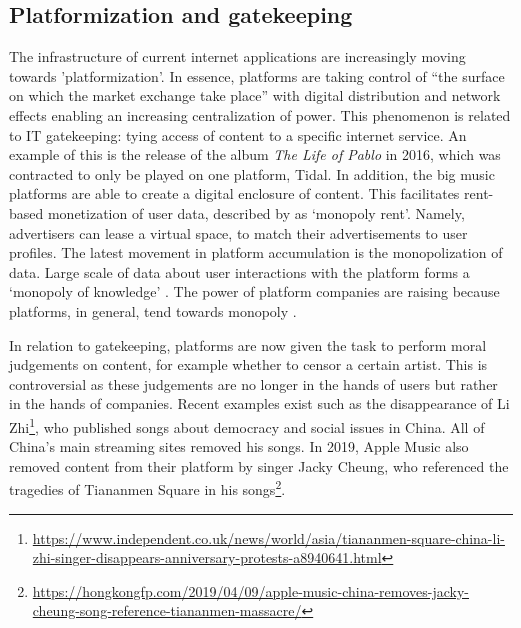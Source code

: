 
\subsection{Platformization and gatekeeping}
The infrastructure of current internet applications are increasingly moving towards 'platformization'. In essence, platforms are taking control of ``the surface on which the market exchange take place'' \citep{andersson2016mastering} with digital distribution and network effects enabling an increasing centralization of power. This phenomenon is related to IT gatekeeping: tying access of content to a specific internet service. An example of this is the release of the album \textit{The Life of Pablo} in 2016, which was contracted to only be played on one platform, Tidal. In addition, the big music platforms are able to create a digital enclosure of content. This facilitates rent-based monetization of user data, described by \cite{harvey2002art} as `monopoly rent'. Namely, advertisers can lease a virtual space, to match their advertisements to user profiles. The latest movement in platform accumulation is the monopolization of data. Large scale of data about user interactions with the platform forms a `monopoly of knowledge' \citep{innis2007empire}. The power of platform companies are raising because platforms, in general, tend towards monopoly \citep{srnicek2017platform}. 

In relation to gatekeeping, platforms are now given the task to perform moral judgements on content, for example whether to censor a certain artist. This is controversial as these judgements are no longer in the hands of users but rather in the hands of companies. Recent examples exist such as the disappearance of Li Zhi\footnote{\url{https://www.independent.co.uk/news/world/asia/tiananmen-square-china-li-zhi-singer-disappears-anniversary-protests-a8940641.html}}, who published songs about democracy and social issues in China. All of China's main streaming sites removed his songs. In 2019, Apple Music also removed content from their platform by singer Jacky Cheung, who referenced the tragedies of Tiananmen Square in his songs\footnote{\url{https://hongkongfp.com/2019/04/09/apple-music-china-removes-jacky-cheung-song-reference-tiananmen-massacre/}}.

